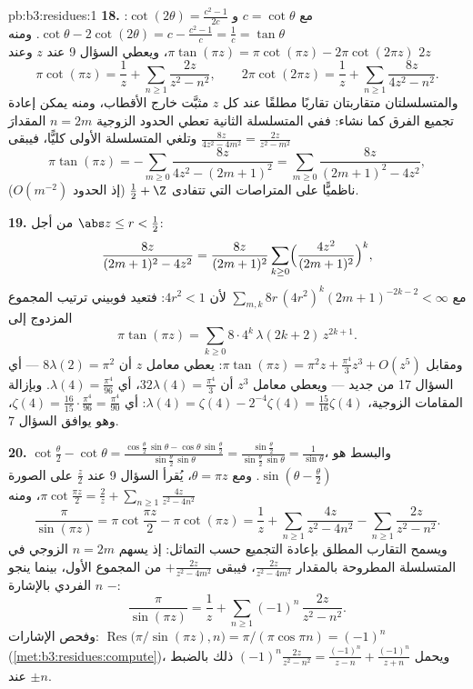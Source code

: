 \begin{solution}{pb:b3:residues:1}
\textbf{18.} مع $c = \cot\theta$ و $\cot(2\theta) =
\frac{c^2-1}{2c}$: $\cot\theta - 2\cot(2\theta) = c -
\frac{c^2-1}c = \frac1c = \tan\theta$. ومنه
$\pi\tan(\pi z)
= \pi\cot(\pi z) - 2\pi\cot(2\pi z)$، ويعطي السؤال 9 عند $z$ وعند $2z$
\[
\pi\cot(\pi z) = \frac1z +
\sum_{n\geq1}\frac{2z}{z^2 - n^2},
\qquad
2\pi\cot(2\pi z) = \frac1z +
\sum_{n\geq1}\frac{8z}{4z^2 - n^2} .
\]
والمتسلسلتان متقاربتان تقاربًا مطلقًا عند كل $z$ مثبَّت خارج
الأقطاب، ومنه يمكن إعادة تجميع الفرق كما نشاء: ففي المتسلسلة
الثانية تعطي الحدود الزوجية $n = 2m$ المقدارَ $\frac{8z}{4z^2 -
4m^2} = \frac{2z}{z^2 - m^2}$ وتلغي
المتسلسلة الأولى كليًّا، فيبقى
\[
\pi\tan(\pi z) = -\sum_{m\geq0}\frac{8z}{4z^2 - (2m+1)^2}
= \sum_{m\geq0}\frac{8z}{(2m+1)^2 - 4z^2} ,
\]
ناظميًّا على المتراصات التي تتفادى $\frac12 + \Z$ (إذ الحدود
$O(m^{-2})$).

\textbf{19.} من أجل $\abs z \leq r < \frac12$:
\[
\frac{8z}{(2m+1)^2 - 4z^2} = \frac{8z}{(2m+1)^2}
\sum_{k\geq0}\Bigl(\frac{4z^2}{(2m+1)^2}\Bigr)^{k},
\]
مع $\sum_{m,k}8r\,(4r^2)^k(2m+1)^{-2k-2} < \infty$ لأن $4r^2 < 1$: فتعيد فوبيني ترتيب المجموع المزدوج
إلى
\[
\pi\tan(\pi z) =
\sum_{k\geq0}8\cdot4^k\,\lambda(2k+2)\,z^{2k+1} .
\]
ومقابل $\pi\tan(\pi z) = \pi^2z + \frac{\pi^4}3z^3 +
O(z^5)$: يعطي معامل $z$ أن $8\lambda(2) = \pi^2$ --- أي السؤال 17 من
جديد --- ويعطي معامل $z^3$ أن $32\lambda(4) = \frac{\pi^4}3$، أي $\lambda(4) =
\frac{\pi^4}{96}$. وبإزالة
المقامات الزوجية، $\lambda(4) = \zeta(4) - 2^{-4}\zeta(4) =
\frac{15}{16}\zeta(4)$: أي $\zeta(4) = \frac{16}{15}\cdot
\frac{\pi^4}{96} = \frac{\pi^4}{90}$، وهو يوافق السؤال 7.

\textbf{20.} $\cot\frac\theta2 - \cot\theta =
\frac{\cos\frac\theta2\,\sin\theta -
\cos\theta\,\sin\frac\theta2}{\sin\frac\theta2\,\sin\theta}
= \frac{\sin\frac\theta2}{\sin\frac\theta2\,\sin\theta} =
\frac1{\sin\theta}$، والبسط هو $\sin(\theta -
\frac\theta2)$. ومع $\theta = \pi z$،
يُقرأ السؤال 9 عند $\frac z2$ على الصورة $\pi\cot\frac{\pi z}2 = \frac2z +
\sum_{n\geq1}\frac{4z}{z^2 - 4n^2}$، ومنه
\[
\frac{\pi}{\sin(\pi z)}
= \pi\cot\frac{\pi z}2 - \pi\cot(\pi z)
= \frac1z + \sum_{n\geq1}\frac{4z}{z^2 - 4n^2}
- \sum_{n\geq1}\frac{2z}{z^2 - n^2} .
\]
ويسمح التقارب المطلق بإعادة التجميع حسب التماثل: إذ يسهم
$n
= 2m$ الزوجي في المتسلسلة المطروحة بالمقدار $\frac{2z}{z^2-4m^2}$، فيبقى
$+\frac{2z}{z^2-4m^2}$ من المجموع الأول، بينما ينجو $n$ الفردي بالإشارة $-$:
\[
\frac{\pi}{\sin(\pi z)} = \frac1z +
\sum_{n\geq1}(-1)^n\,\frac{2z}{z^2 - n^2} .
\]
وفحص الإشارات: $\operatorname{Res}\bigl(\pi/\sin(\pi z),
n\bigr) = \pi/(\pi\cos\pi n) = (-1)^n$ (\cref{met:b3:residues:compute})، ويحمل $(-1)^n\frac{2z}{z^2 -
n^2} = \frac{(-1)^n}{z-n} + \frac{(-1)^n}{z+n}$ ذلك 
بالضبط عند $\pm n$.


\end{solution}
